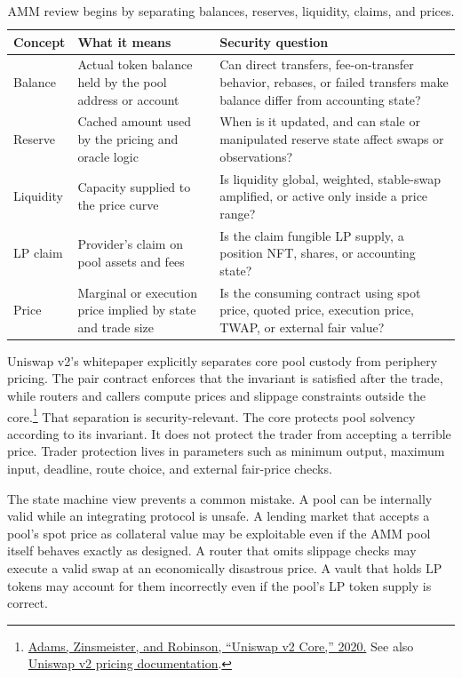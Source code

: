 \begin{table}[htbp]
\centering
\small
\renewcommand{\arraystretch}{1.16}
\begin{tabularx}{\textwidth}{@{}>{\RaggedRight\arraybackslash}p{}>{\RaggedRight\arraybackslash}p{}X@{}}
\toprule
Concept & What it means & Security question \\
\midrule
Balance & Actual token balance held by the pool address or account & Can direct transfers, fee-on-transfer behavior, rebases, or failed transfers make balance differ from accounting state? \\
Reserve & Cached amount used by the pricing and oracle logic & When is it updated, and can stale or manipulated reserve state affect swaps or observations? \\
Liquidity & Capacity supplied to the price curve & Is liquidity global, weighted, stable-swap amplified, or active only inside a price range? \\
LP claim & Provider's claim on pool assets and fees & Is the claim fungible LP supply, a position NFT, shares, or accounting state? \\
Price & Marginal or execution price implied by state and trade size & Is the consuming contract using spot price, quoted price, execution price, TWAP, or external fair value? \\
\bottomrule
\end{tabularx}
\caption{AMM review begins by separating balances, reserves, liquidity, claims, and prices.}
\end{table}

Uniswap v2's whitepaper explicitly separates core pool custody from periphery pricing. The pair contract enforces that the invariant is satisfied after the trade, while routers and callers compute prices and slippage constraints outside the core.\footnote{\href{https://app.uniswap.org/whitepaper.pdf}{Adams, Zinsmeister, and Robinson, ``Uniswap v2 Core,'' 2020.} See also \href{https://developers.uniswap.org/docs/protocols/v2/concepts/pricing}{Uniswap v2 pricing documentation}.} That separation is security-relevant. The core protects pool solvency according to its invariant. It does not protect the trader from accepting a terrible price. Trader protection lives in parameters such as minimum output, maximum input, deadline, route choice, and external fair-price checks.

The state machine view prevents a common mistake. A pool can be internally valid while an integrating protocol is unsafe. A lending market that accepts a pool's spot price as collateral value may be exploitable even if the AMM pool itself behaves exactly as designed. A router that omits slippage checks may execute a valid swap at an economically disastrous price. A vault that holds LP tokens may account for them incorrectly even if the pool's LP token supply is correct.

